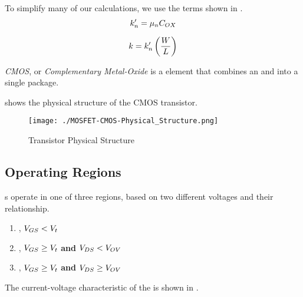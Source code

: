 To simplify many of our calculations, we use the terms shown in .
\begin{equation}\label{eq:MOSFET-kPrime}
  k_{n}' = \mu_{n} C_{OX}
\end{equation}

\begin{equation}\label{eq:MOSFET-k}
  k = k_{n}' \left( \frac{W}{L} \right)
\end{equation}

\begin{definition}[CMOS]\label{def:CMOS}
  \emph{CMOS}, or \emph{Complementary Metal-Oxide } is a  element that combines an  and  into a single package.

   shows the physical structure of the CMOS transistor.
\end{definition}

\begin{figure}[h!tbp]
  \centering
  \texttt{[image: ./MOSFET-CMOS-Physical\_Structure.png]}
  \caption{ Transistor Physical Structure \parencite[p.~264]{sedraTextbook7}}
  \label{fig:MOSFET-Physical_Structure-CMOS}
\end{figure}

\subsection{Operating Regions}\label{subsec:MOSFET_Operating_Regions}
s operate in one of three regions, based on two different voltages and their relationship.
\begin{enumerate}[noitemsep]
\item {}, $V_{GS} < V_{t}$
\item {}, $V_{GS} \geq V_{t}$ \textbf{and} $V_{DS} < V_{OV}$
\item {}, $V_{GS} \geq V_{t}$ \textbf{and} $V_{DS} \geq V_{OV}$
\end{enumerate}

The current-voltage characteristic of the   is shown in .

